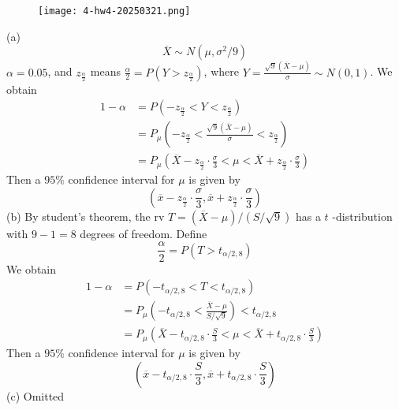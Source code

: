 \begin{figure}[H]
\centering
\texttt{[image: 4-hw4-20250321.png]}
\label{}
\end{figure}

(a)
\[
\overline{X}\sim N(\mu,\sigma^{2}/9)
\]
$\alpha=0.05$, and $z_{\frac{\alpha}{2}}$ means $\frac{\alpha}{2}=P\left( Y>z_{\frac{\alpha}{2}} \right)$, where $Y=\frac{\sqrt{ 9 }(\overline{X}-\mu)}{\sigma}\sim N(0,1)$. We obtain
\[
\begin{aligned}
1-\alpha & =P\left( -z_{\frac{\alpha}{2}}<Y <z_{\frac{\alpha}{2}}\right) \\
 & =P_{\mu}\left( -z_{\frac{\alpha}{2}}<\frac{\sqrt{ 9 }(\overline{X}-\mu)}{\sigma}<z_{\frac{\alpha}{2}} \right) \\
 & =P_{\mu}\left( \overline{X}-z_{\frac{\alpha}{2}}\cdot\frac{\sigma}{3}<\mu<\overline{X}+z_{\frac{\alpha}{2}}\cdot\frac{\sigma}{3} \right)
\end{aligned}
\]
Then a $95\%$ confidence interval for $\mu$ is given by
\[
\left( \overline{x}-z_{\frac{\alpha}{2}}\cdot\frac{\sigma}{3},\overline{x}+z_{\frac{\alpha}{2}}\cdot\frac{\sigma}{3} \right)
\]
(b)
By student's theorem, the rv $T=(\overline{X}-\mu)/(S/\sqrt{ 9 })$ has a $t$ -distribution with $9-1=8$ degrees of freedom. Define
\[
\frac{\alpha}{2}=P(T>t_{\alpha/2,8})
\]
We obtain
\[
\begin{aligned}
1-\alpha & =P(-t_{\alpha/2,8}<T<t_{\alpha/2,8} ) \\
 & =P_{\mu}\left( -t_{\alpha/2,8}<\frac{\overline{X}-\mu}{S/\sqrt{ 9 }} \right)<t_{\alpha/2,8}  \\
 & =P_{\mu}\left( \overline{X}-t_{\alpha /2,8}\cdot \frac{S}{3}<\mu<\overline{X}+t_{\alpha/2,8}\cdot \frac{S}{3} \right)
\end{aligned}
\]
Then a $95\%$ confidence interval for $\mu$ is given by
\[
\left( \overline{x}-t_{\alpha/2,8}\cdot \frac{S}{3},\overline{x}+t_{\alpha/2,8}\cdot \frac{S}{3} \right)
\]
(c)
Omitted

